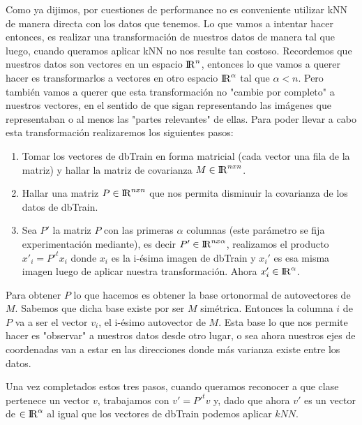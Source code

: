 \par Como ya dijimos, por cuestiones de performance no es conveniente utilizar kNN de manera directa con los datos que tenemos. Lo que vamos a intentar hacer entonces, es realizar una transformación de nuestros datos de manera tal que luego, cuando queramos aplicar kNN no nos resulte tan costoso. Recordemos que nuestros datos son vectores en un espacio ${\rm I\!R}^n$, entonces lo que vamos a querer hacer es transformarlos a vectores en otro espacio ${\rm I\!R}^\alpha$ tal que $\alpha < n$. Pero también vamos a querer que esta transformación no "cambie por completo" a nuestros vectores, en el sentido de que sigan representando las imágenes que representaban o al menos las "partes relevantes" de ellas. Para poder llevar a cabo esta transformación realizaremos los siguientes pasos:

\begin{enumerate}
\item Tomar los vectores de dbTrain en forma matricial (cada vector una fila de la matriz) y hallar la matriz de covarianza $M \in {\rm I\!R}^{nxn}$.
\item Hallar una matriz $P \in {\rm I\!R}^{nxn}$ que nos permita disminuir la covarianza de los datos de dbTrain.
\item Sea $P'$ la matriz $P$ con las primeras $\alpha$ columnas (este parámetro se fija experimentación mediante), es decir $P' \in {\rm I\!R}^{nx\alpha}$, realizamos el producto $x'_i = P'^tx_i$ donde $x_i$ es la i-ésima imagen de dbTrain y $x_i'$ es esa misma imagen luego de aplicar nuestra transformación. Ahora $x_i' \in {\rm I\!R}^{\alpha}$.
\end{enumerate}

Para obtener $P$ lo que hacemos es obtener la base ortonormal de autovectores de $M$. Sabemos que dicha base existe por ser $M$ simétrica. Entonces la columna $i$ de $P$ va a ser el vector $v_i$, el i-ésimo autovector de $M$. Esta base lo que nos permite hacer es "observar" a nuestros datos desde otro lugar, o sea ahora nuestros ejes de coordenadas van a estar en las direcciones donde más varianza existe entre los datos.

Una vez completados estos tres pasos, cuando queramos reconocer a que clase pertenece un vector $v$, trabajamos con $v'= P'^tv$ y, dado que ahora $v'$ es un vector de $\in {\rm I\!R}^{\alpha}$ al igual que los vectores de dbTrain podemos aplicar $kNN$.
